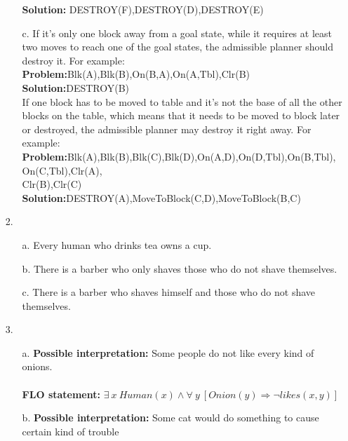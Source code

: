 \documentclass{article}
\begin{document}
\begin{titlepage}
\begin{enumerate}
\begin{enumerate}
                   \textbf{Solution:} DESTROY(F),DESTROY(D),DESTROY(E)\\
   		\item[c.] If it's only one block away from a goal state, while it requires at least two moves to reach one of the goal states, the admissible 
                   planner should destroy it. For example:\\
                   \textbf{Problem:}Blk(A),Blk(B),On(B,A),On(A,Tbl),Clr(B)\\
                   \textbf{Solution:}DESTROY(B)\\
                   If one block has to be moved to table and it's not the base of all the other blocks on the table, which means that it needs to be moved to block later or destroyed, the admissible planner may destroy it right away. For example:\\
                   \textbf{Problem:}Blk(A),Blk(B),Blk(C),Blk(D),On(A,D),On(D,Tbl),On(B,Tbl),On(C,Tbl),Clr(A),\\
                   Clr(B),Clr(C)\\
                   \textbf{Solution:}DESTROY(A),MoveToBlock(C,D),MoveToBlock(B,C)\\
   	\end{enumerate}
   	\item[2.]
   	\begin{enumerate}
   		\item[a.] Every human who drinks tea owns a cup.
   		\item[b.] There is a barber who only shaves those who do not shave themselves. 
   		\item[c.] There is a barber who shaves himself and those who do not shave themselves.\\
   	\end{enumerate}
   	\item[3.]
   	\begin{enumerate}
   		\item[a.] \textbf{Possible interpretation:} Some people do not like every kind of onions.\\\\
                  \textbf{FLO statement:} \(\exists\ x\ Human(x)\wedge\forall\ y\ [Onion(y)\Rightarrow\neg likes(x,y)] \)\\
   		\item[b.] \textbf{Possible interpretation:} Some cat would do something to cause certain kind of trouble\\\\

\end{enumerate}
\end{enumerate}
\end{titlepage}
\end{document}
